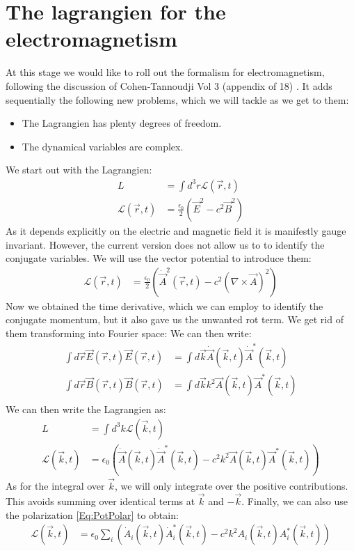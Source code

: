 \documentclass[10pt]{article}
\let\cite\citep
\providecommand\citep{\cite}
\begin{document}
\section{The lagrangien for the electromagnetism}

At this stage we would like to roll out the formalism for electromagnetism, following the discussion of Cohen-Tannoudji Vol 3 (appendix of 18) \cite{laloe2017}. It adds sequentially the following new problems, which we will tackle as we get to them:
\begin{itemize}
\item The Lagrangien has plenty degrees of freedom.
\item The dynamical variables are complex.
\end{itemize}
We start out with the Lagrangien:
\begin{align}
L &= \int d^3r \mathcal{L}(\vec{r},t)\\
\mathcal{L}(\vec{r},t)&= \frac{\epsilon_0}{2}\left(\vec{E}^2-c^2\vec{B}^2\right)
\end{align}
As it depends explicitly on the electric and magnetic field it is manifestly gauge invariant. However, the current version does not allow us to to identify the conjugate variables. We will use the vector potential to introduce them:
\begin{align}
\mathcal{L}(\vec{r},t)&= \frac{\epsilon_0}{2}\left(\dot{\vec{A}}^2(\vec{r},t)-c^2\left(\nabla \times \vec{A}\right)^2\right)
\end{align}
Now we obtained the time derivative, which we can employ to identify the conjugate momentum, but it also gave us the unwanted rot term. We get rid of them transforming into Fourier space:
We can then write:
\begin{align}
\int d\vec{r} \vec{E}(\vec{r},t)\vec{E}(\vec{r},t)&= \int d\vec{k} \dot{\vec{A}}(\vec{k},t)\dot{\vec{A}}^*(\vec{k},t)\\
\int d\vec{r} \vec{B}(\vec{r},t)\vec{B}(\vec{r},t)&= \int d\vec{k}k^2 \vec{A}(\vec{k},t)\vec{A}^*(\vec{k},t)\\
\end{align}
We can then write the Lagrangien as:
\begin{align}
L &= \int d^3k \mathcal{L}(\vec{k},t)\\
\mathcal{L}(\vec{k},t) &= \epsilon_0\left( \dot{\vec{A}}(\vec{k},t)\dot{\vec{A}}^*(\vec{k},t)-c^2k^2 \vec{A}(\vec{k},t)\vec{A}^*(\vec{k},t)\right)
\end{align}
As for the integral over $\vec{k}$, we will only integrate over the positive contributions. This avoids summing over identical terms at $\vec{k}$ and $-\vec{k}$. Finally, we can also use the polarization \eqref{Eq:PotPolar} to obtain:
\begin{align}
\mathcal{L}(\vec{k},t)&= \epsilon_0\sum_i \left( \dot{A}_i(\vec{k},t)\dot{A}_i^*(\vec{k},t)-c^2k^2 A_i(\vec{k},t)A_i^*(\vec{k},t)\right)
\end{align}
\end{document}
